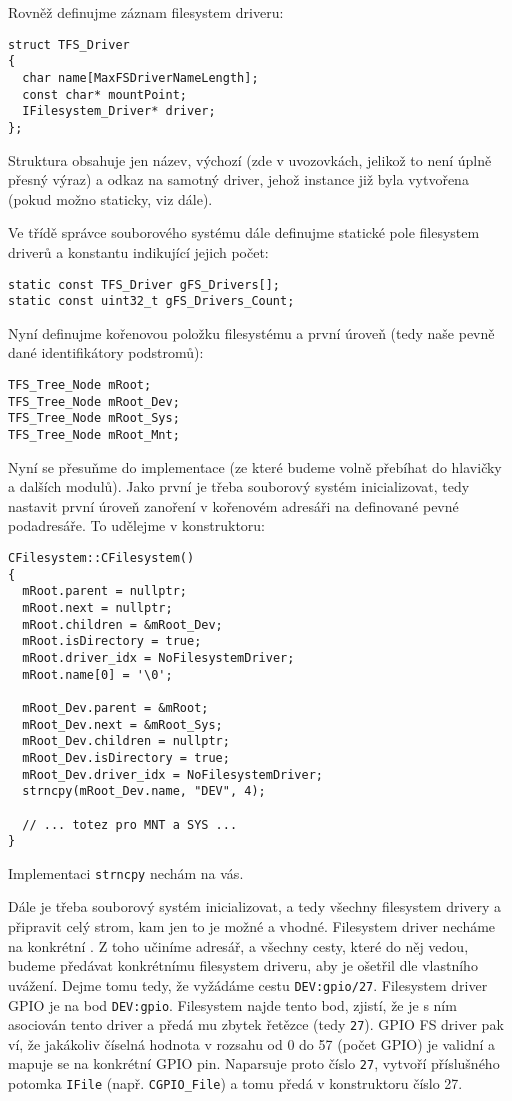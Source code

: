 \documentclass{article}
\begin{document}
Rovněž definujme záznam filesystem driveru:
\begin{lstlisting}
struct TFS_Driver
{
  char name[MaxFSDriverNameLength];
  const char* mountPoint;
  IFilesystem_Driver* driver;
};
\end{lstlisting}
Struktura obsahuje jen název, výchozí  (zde v uvozovkách, jelikož to není úplně přesný výraz) a odkaz na samotný driver, jehož instance již byla vytvořena (pokud možno staticky, viz dále).

Ve třídě správce souborového systému dále definujme statické pole filesystem driverů a konstantu indikující jejich počet:
\begin{lstlisting}
static const TFS_Driver gFS_Drivers[];
static const uint32_t gFS_Drivers_Count;
\end{lstlisting}

Nyní definujme kořenovou položku filesystému a první úroveň (tedy naše pevně dané identifikátory podstromů):
\begin{lstlisting}
TFS_Tree_Node mRoot;
TFS_Tree_Node mRoot_Dev;
TFS_Tree_Node mRoot_Sys;
TFS_Tree_Node mRoot_Mnt;
\end{lstlisting}

Nyní se přesuňme do implementace (ze které budeme volně přebíhat do hlavičky a dalších modulů). Jako první je třeba souborový systém inicializovat, tedy nastavit první úroveň zanoření v kořenovém adresáři na definované pevné podadresáře. To udělejme v konstruktoru:

\begin{lstlisting}
CFilesystem::CFilesystem()
{	
  mRoot.parent = nullptr;	
  mRoot.next = nullptr;
  mRoot.children = &mRoot_Dev;
  mRoot.isDirectory = true;
  mRoot.driver_idx = NoFilesystemDriver;
  mRoot.name[0] = '\0';
	
  mRoot_Dev.parent = &mRoot;
  mRoot_Dev.next = &mRoot_Sys;
  mRoot_Dev.children = nullptr;
  mRoot_Dev.isDirectory = true;
  mRoot_Dev.driver_idx = NoFilesystemDriver;
  strncpy(mRoot_Dev.name, "DEV", 4);
	
  // ... totez pro MNT a SYS ...
}
\end{lstlisting}
Implementaci \texttt{strncpy} nechám na vás.

Dále je třeba souborový systém inicializovat, a tedy  všechny filesystem drivery a připravit celý strom, kam jen to je možné a vhodné. Filesystem driver necháme  na konkrétní . Z toho učiníme adresář, a všechny cesty, které do něj vedou, budeme předávat konkrétnímu filesystem driveru, aby je ošetřil dle vlastního uvážení. Dejme tomu tedy, že vyžádáme cestu \texttt{DEV:gpio/27}. Filesystem driver GPIO je  na bod \texttt{DEV:gpio}. Filesystem najde tento bod, zjistí, že je s ním asociován tento driver a předá mu zbytek řetězce (tedy \texttt{27}). GPIO FS driver pak ví, že jakákoliv číselná hodnota v rozsahu od 0 do 57 (počet GPIO) je validní a mapuje se na konkrétní GPIO pin. Naparsuje proto číslo \texttt{27}, vytvoří příslušného potomka \texttt{IFile} (např. \texttt{CGPIO\_File}) a tomu předá v konstruktoru číslo 27.
\end{document}
